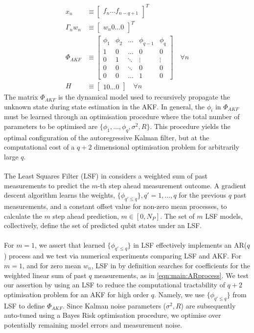 \begin{align}
x_n & \equiv  \begin{bmatrix} f_{n} \hdots f_{n-q+1} \end{bmatrix}^T \\
\Gamma_n w_n & \equiv \begin{bmatrix} w_{n} 0 \hdots 0 \end{bmatrix}^T \\
\Phi_{AKF} & \equiv 
\begin{bmatrix}
\phi_1 & \phi_2 & \hdots & \phi_{q-1} & \phi_q \\ 
1 & 0 & \hdots & 0 & 0 \\  
0 & 1 & \ddots & \vdots & \vdots \\ 
0 & 0 & \ddots & 0 & 0 \\ 
0 & 0 & \hdots & 1 & 0 
\end{bmatrix} \quad \forall n \label{eqn:akf_Phi} \\
H & \equiv \begin{bmatrix} 1 0 \hdots 0 \end{bmatrix} \quad \forall n  
\end{align}
The matrix $\Phi_{AKF}$ is the dynamical model used to recursively propagate the unknown state during state estimation in the AKF. In general, the ${\phi_i}$ in $\Phi_{AKF}$ must be learned through an optimisation procedure where the total number of parameters to be optimised are $\{\phi_1, \hdots, \phi_q, \sigma^2, R \}$. This procedure yields the optimal configuration of the autoregressive Kalman filter, but at the computational cost of a $q+2$ dimensional optimisation problem for arbitrarily large $q$.
\\
\\
The Least Squares Filter (LSF) in \cite{mavadia2017} considers a weighted sum of past measurements to predict the $m$-th step ahead measurement outcome. A gradient descent algorithm learns the weights, $\{\phi_{q' \leq q}\}, q' = 1, ... , q $ for the previous $q$ past measurements, and a constant offset value for non-zero mean processes, to calculate the $m$ step ahead prediction, $m \in [0, N_P]$. The set of $m$ LSF models, collectively, define the set of predicted qubit states under an LSF.
\\
\\
For $m=1$, we assert that learned $\{\phi_{q' \leq q}\}$ in LSF effectively implements an AR($q$) process and we test via numerical experiments comparing LSF and AKF. For $m=1$, and for zero mean $w_n$, LSF in \cite{mavadia2017} by definition searches for coefficients for the weighted linear sum of past $q$ measurements, as in \cref{eqn:main:ARprocess}. We test our assertion by using an LSF to reduce the computational tractability of $q+2$ optimisation problem for an AKF for high order $q$. Namely, we use  $\{\phi_{q' \leq q}\}$ from LSF to define $\Phi_{AKF}$. Since Kalman noise parameters ($\sigma^2, R$) are subsequently auto-tuned using a Bayes Risk optimisation procedure, we optimise over potentially remaining model errors and measurement noise.
